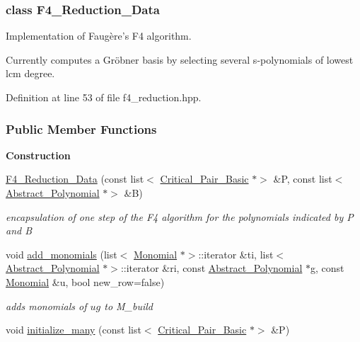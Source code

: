 \subsubsection{class F4\+\_\+\+Reduction\+\_\+\+Data}
Implementation of Faug\`{e}re's F4 algorithm. 

Currently computes a Gr\"{o}bner basis by selecting several s-\/polynomials of lowest lcm degree. 

Definition at line 53 of file f4\+\_\+reduction.\+hpp.

\subsubsection*{Public Member Functions}
\begin{Indent}\textbf{ Construction}\par
\begin{DoxyCompactItemize}
\item 
\hyperlink{group___g_b_computation_ada9c61c0f75be4a2b3dd5c762c1c9a1b}{F4\+\_\+\+Reduction\+\_\+\+Data} (const list$<$ \hyperlink{group___g_b_computation_class_critical___pair___basic}{Critical\+\_\+\+Pair\+\_\+\+Basic} $\ast$$>$ \&P, const list$<$ \hyperlink{group__polygroup_class_abstract___polynomial}{Abstract\+\_\+\+Polynomial} $\ast$$>$ \&B)
\begin{DoxyCompactList}\small\item\em encapsulation of one step of the F4 algorithm for the polynomials indicated by {\ttfamily P} and {\ttfamily B} \end{DoxyCompactList}\item 
void \hyperlink{group___g_b_computation_ad241aa62afb6b6e0b482496c7559f092}{add\+\_\+monomials} (list$<$ \hyperlink{group__polygroup_class_monomial}{Monomial} $\ast$$>$\+::iterator \&ti, list$<$ \hyperlink{group__polygroup_class_abstract___polynomial}{Abstract\+\_\+\+Polynomial} $\ast$$>$\+::iterator \&ri, const \hyperlink{group__polygroup_class_abstract___polynomial}{Abstract\+\_\+\+Polynomial} $\ast$g, const \hyperlink{group__polygroup_class_monomial}{Monomial} \&u, bool new\+\_\+row=false)
\begin{DoxyCompactList}\small\item\em adds monomials of $ ug $ to {\ttfamily M\+\_\+build} \end{DoxyCompactList}\item 
void \hyperlink{group___g_b_computation_a0fd30b42c2dcf0dd07dfa898f71c8751}{initialize\+\_\+many} (const list$<$ \hyperlink{group___g_b_computation_class_critical___pair___basic}{Critical\+\_\+\+Pair\+\_\+\+Basic} $\ast$$>$ \&P)
$$
\end{DoxyCompactItemize}
\end{Indent}
